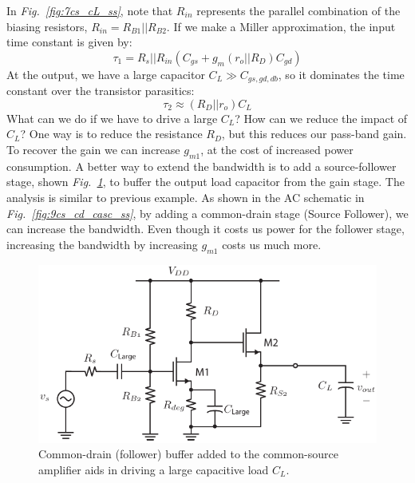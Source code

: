 In \emph{Fig.~\ref{fig:7cs_cL_ss}}, note that $R_{in}$ represents the parallel combination of the biasing resistors, $R_{in} = R_{B1} || R_{B2}$.  If we make a Miller approximation, the input time constant is given by:
    \begin{equation}
        \tau_1 = R_s || R_{in} (C_{gs} + g_m (r_o||R_D) C_{gd} )
    \end{equation}
At the output, we have a large capacitor $C_L \gg C_{gs,gd,db}$, so it dominates the time constant over the transistor parasitics:
    \begin{equation}
        \tau_2 \approx (R_D|| r_o) C_L 
    \end{equation}
What can we do if we have to drive a large $C_L$?  How can we reduce the impact of $C_L$? One way is to reduce the resistance $R_D$, but this reduces our pass-band gain.   To recover the gain we can increase $g_{m1}$, at the cost of increased power consumption.   A better way to extend the bandwidth is to add a source-follower stage, shown \emph{Fig.~\ref{fig:8_cs_cd_casc_dc}}, to buffer the output load capacitor from the gain stage.  The analysis is similar to previous example.  As shown in the AC schematic in \emph{Fig.~\ref{fig:9cs_cd_casc_ss}}, by adding a common-drain stage (Source Follower), we can increase the bandwidth. Even though it costs us power for the follower stage, increasing the bandwidth by increasing $g_{m1}$ costs us much more.
\begin{figure}[tb]
\centering
\includegraphics[scale=1]{8_cs_cd_casc_dc}
\caption{Common-drain (follower) buffer added to the common-source amplifier aids in driving a large capacitive load $C_L$.}
\label{fig:8_cs_cd_casc_dc}
\end{figure}
